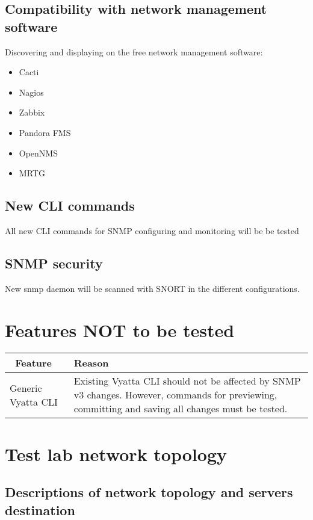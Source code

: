 \documentclass[a4paper,11pt]{article}
\begin{document}
\subsection{Compatibility with network management software}
Discovering and displaying on the free network management software:
\begin{itemize}
\item Cacti
\item Nagios
\item Zabbix 
\item Pandora FMS
\item OpenNMS
\item MRTG
\end{itemize}


\subsection{New CLI commands}
All new CLI commands for SNMP configuring and monitoring will be be tested

\subsection{SNMP security}
New snmp daemon will be scanned with SNORT in the different configurations. 


\section{Features NOT to be tested}
\begin{tabular}{|p{5cm}|p{10cm}|}
\hline
\ \bf Feature & \bf Reason \\ \hline
Generic Vyatta CLI&Existing Vyatta CLI should not be affected by SNMP v3 changes. However, commands for previewing, committing and saving all changes must be tested. \\ \hline
\end{tabular}


\newpage
\section{Test lab network topology}

\subsection{Descriptions of network topology and servers destination}
\end{document}
